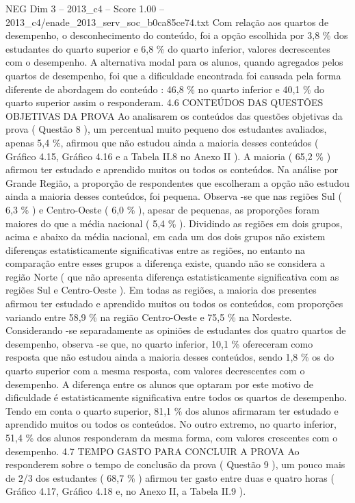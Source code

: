 \begin{textsample}{NEG Dim 3 – 2013\_c4 – Score 1.00 – 2013\_c4/enade\_2013\_serv\_soc\_b0ca85ce74.txt}
Com relação aos quartos de desempenho, o desconhecimento do conteúdo, foi a opção escolhida por 3,8 \% dos estudantes do quarto superior e 6,8 \% do quarto inferior, valores decrescentes com o desempenho.
A alternativa modal para os alunos, quando agregados pelos quartos de desempenho, foi que a dificuldade encontrada foi causada pela forma diferente de abordagem do conteúdo : 46,8 \% no quarto inferior e 40,1 \% do quarto superior assim o responderam. 4.6 CONTEÚDOS DAS QUESTÕES OBJETIVAS DA PROVA Ao analisarem os conteúdos das questões objetivas da prova ( Questão 8 ), um percentual muito pequeno dos estudantes avaliados, apenas 5,4 \%, afirmou que não estudou ainda a maioria desses conteúdos ( Gráfico 4.15, Gráfico 4.16 e a Tabela II.8 no Anexo II ).
A maioria ( 65,2 \% ) afirmou ter estudado e aprendido muitos ou todos os conteúdos.
Na análise por Grande Região, a proporção de respondentes que escolheram a opção não estudou ainda a maioria desses conteúdos, foi pequena.
Observa -se que nas regiões Sul ( 6,3 \% ) e Centro-Oeste ( 6,0 \% ), apesar de pequenas, as proporções foram maiores do que a média nacional ( 5,4 \% ).
Dividindo as regiões em dois grupos, acima e abaixo da média nacional, em cada um dos dois grupos não existem diferenças estatisticamente significativas entre as regiões, no entanto na comparação entre esses grupos a diferença existe, quando não se considera a região Norte ( que não apresenta diferença estatisticamente significativa com as regiões Sul e Centro-Oeste ).
Em todas as regiões, a maioria dos presentes afirmou ter estudado e aprendido muitos ou todos os conteúdos, com proporções variando entre 58,9 \% na região Centro-Oeste e 75,5 \% na Nordeste.
Considerando -se separadamente as opiniões de estudantes dos quatro quartos de desempenho, observa -se que, no quarto inferior, 10,1 \% ofereceram como resposta que não estudou ainda a maioria desses conteúdos, sendo 1,8 \% os do quarto superior com a mesma resposta, com valores decrescentes com o desempenho.
A diferença entre os alunos que optaram por este motivo de dificuldade é estatisticamente significativa entre todos os quartos de desempenho.
Tendo em conta o quarto superior, 81,1 \% dos alunos afirmaram ter estudado e aprendido muitos ou todos os conteúdos.
No outro extremo, no quarto inferior, 51,4 \% dos alunos responderam da mesma forma, com valores crescentes com o desempenho. 4.7 TEMPO GASTO PARA CONCLUIR A PROVA Ao responderem sobre o tempo de conclusão da prova ( Questão 9 ), um pouco mais de 2/3 dos estudantes ( 68,7 \% ) afirmou ter gasto entre duas e quatro horas ( Gráfico 4.17, Gráfico 4.18 e, no Anexo II, a Tabela II.9 ).

\end{textsample}

